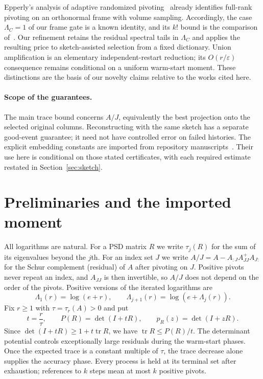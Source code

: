 \documentclass[11pt]{article}
\theoremstyle{definition}\newtheorem{definition}[theorem]{Definition}
\theoremstyle{remark}\newtheorem{remark}[theorem]{Remark}
\newcommand{\eps}{\varepsilon}
\newcommand{\tr}{\operatorname{tr}}
\newcommand{\1}{\mathbf 1}
\begin{document}
Epperly's analysis of adaptive randomized pivoting~\cite{EpperlyARP}
already identifies full-rank pivoting on an orthonormal frame with volume
sampling. Accordingly, the case $\Lambda_C=1$ of our frame gate is a
known identity, and its $k!$ bound is the comparison of~\cite{DV}. Our
refinement retains the residual spectral tails in $\Lambda_C$ and applies
the resulting price to sketch-assisted selection from a fixed dictionary.
Union amplification is an elementary independent-restart reduction;
its $O(r/\eps)$ consequence remains conditional on a uniform warm-start
moment. These distinctions are the basis of our novelty claims relative
to the works cited here.

\paragraph{Scope of the guarantees.}
The main trace bound concerns $A/J$, equivalently the best projection
onto the selected original columns. Reconstructing with the same sketch
has a separate good-event guarantee; it need not have controlled error
on failed histories. The explicit embedding constants are imported from
repository manuscripts~\cite{SparseStack,SRHThybrid}. Their use here is
conditional on those stated certificates, with each required estimate
restated in Section~\ref{sec:sketch}.
\section{Preliminaries and the imported moment}\label{sec:prelim}
All logarithms are natural. For a PSD matrix $R$ we write $\tau_j(R)$
for the sum of its eigenvalues beyond the $j$th. For an index set $J$
we write $A/J=A-A_{:J}A_{JJ}^{+}A_{J:}$ for the Schur complement
(residual) of $A$ after pivoting on $J$. Positive pivots never repeat an
index, and $A_{JJ}$ is then invertible, so $A/J$ does not depend on the
order of the pivots. Positive versions of the iterated logarithms are
\begin{equation}\label{eq:Lambda}
 \Lambda_1(r)=\log(e+r),\qquad
 \Lambda_{j+1}(r)=\log(e+\Lambda_j(r)).
\end{equation}
Fix $r\ge1$ with $\tau=\tau_r(A)>0$ and put
\[
 t=\frac r\tau,\qquad
 P(R)=\det(I+tR),\qquad
 p_R(z)=\det(I+zR).
\]
Since $\det(I+tR)\ge1+t\tr R$, we have $\tr R\le P(R)/t$.
The determinant potential controls exceptionally large residuals during
the warm-start phases. Once the expected trace is a constant multiple of
$\tau$, the trace decrease alone supplies the accuracy phase.
Every process is held at its terminal set after exhaustion; references
to $k$ steps mean at most $k$ positive pivots.
\end{document}
